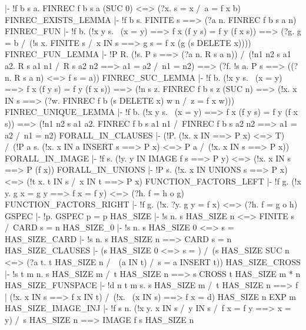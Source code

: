   |- !f b s a. FINREC f b s a (SUC 0) <=> (?x. s = {x} /\ a = f x b)
\ENDTHEOREM
\THEOREM FINREC\_EXISTS\_LEMMA
  |- !f b s. FINITE s ==> (?a n. FINREC f b s a n)
\ENDTHEOREM
\THEOREM FINREC\_FUN
  |- !f b.
         (!x y s. ~(x = y) ==> f x (f y s) = f y (f x s))
         ==> (?g. g {} = b /\
                  (!s x. FINITE s /\ x IN s ==> g s = f x (g (s DELETE x))))
\ENDTHEOREM
\THEOREM FINREC\_FUN\_LEMMA
  |- !P R.
         (!s. P s ==> (?a n. R s a n)) /\
         (!n1 n2 s a1 a2. R s a1 n1 /\ R s a2 n2 ==> a1 = a2 /\ n1 = n2)
         ==> (?f. !s a. P s ==> ((?n. R s a n) <=> f s = a))
\ENDTHEOREM
\THEOREM FINREC\_SUC\_LEMMA
  |- !f b.
         (!x y s. ~(x = y) ==> f x (f y s) = f y (f x s))
         ==> (!n s z.
                  FINREC f b s z (SUC n)
                  ==> (!x. x IN s
                           ==> (?w. FINREC f b (s DELETE x) w n /\ z = f x w)))
\ENDTHEOREM
\THEOREM FINREC\_UNIQUE\_LEMMA
  |- !f b.
         (!x y s. ~(x = y) ==> f x (f y s) = f y (f x s))
         ==> (!n1 n2 s a1 a2.
                  FINREC f b s a1 n1 /\ FINREC f b s a2 n2
                  ==> a1 = a2 /\ n1 = n2)
\ENDTHEOREM
\THEOREM FORALL\_IN\_CLAUSES
  |- (!P. (!x. x IN {} ==> P x) <=> T) /\
     (!P a s. (!x. x IN a INSERT s ==> P x) <=> P a /\ (!x. x IN s ==> P x))
\ENDTHEOREM
\THEOREM FORALL\_IN\_IMAGE
  |- !f s. (!y. y IN IMAGE f s ==> P y) <=> (!x. x IN s ==> P (f x))
\ENDTHEOREM
\THEOREM FORALL\_IN\_UNIONS
  |- !P s. (!x. x IN UNIONS s ==> P x) <=> (!t x. t IN s /\ x IN t ==> P x)
\ENDTHEOREM
\THEOREM FUNCTION\_FACTORS\_LEFT
  |- !f g. (!x y. g x = g y ==> f x = f y) <=> (?h. f = h o g)
\ENDTHEOREM
\THEOREM FUNCTION\_FACTORS\_RIGHT
  |- !f g. (!x. ?y. g y = f x) <=> (?h. f = g o h)
\ENDTHEOREM
\THEOREM GSPEC
  |- !p. GSPEC p = p
\ENDTHEOREM
\THEOREM HAS\_SIZE
  |- !s n. s HAS_SIZE n <=> FINITE s /\ CARD s = n
\ENDTHEOREM
\THEOREM HAS\_SIZE\_0
  |- !s n. s HAS_SIZE 0 <=> s = {}
\ENDTHEOREM
\THEOREM HAS\_SIZE\_CARD
  |- !s n. s HAS_SIZE n ==> CARD s = n
\ENDTHEOREM
\THEOREM HAS\_SIZE\_CLAUSES
  |- (s HAS_SIZE 0 <=> s = {}) /\
     (s HAS_SIZE SUC n <=>
      (?a t. t HAS_SIZE n /\ ~(a IN t) /\ s = a INSERT t))
\ENDTHEOREM
\THEOREM HAS\_SIZE\_CROSS
  |- !s t m n. s HAS_SIZE m /\ t HAS_SIZE n ==> s CROSS t HAS_SIZE m * n
\ENDTHEOREM
\THEOREM HAS\_SIZE\_FUNSPACE
  |- !d n t m s.
         s HAS_SIZE m /\ t HAS_SIZE n
         ==> {f | (!x. x IN s ==> f x IN t) /\ (!x. ~(x IN s) ==> f x = d)} HAS_SIZE
             n EXP m
\ENDTHEOREM
\THEOREM HAS\_SIZE\_IMAGE\_INJ
  |- !f s n.
         (!x y. x IN s /\ y IN s /\ f x = f y ==> x = y) /\ s HAS_SIZE n
         ==> IMAGE f s HAS_SIZE n
